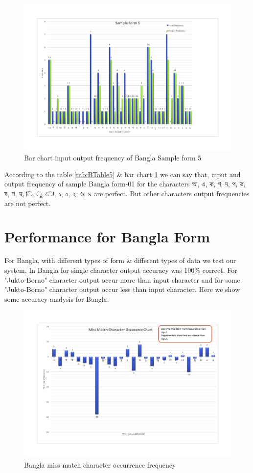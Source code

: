 \begin{figure}[H]
\centering
\includegraphics[width=1\textwidth]{Bform5.pdf}
\caption {Bar chart input output frequency of Bangla Sample form 5}
\label {fig:Bbar5}
\end{figure}

According to the table \ref{tab:BTable5} \& bar chart \ref{fig:Bbar5} we can say that, input and output frequency of sample Bangla form-01 for the characters {\bengalifont আ, এ, ক, গ, দ, প, ভ, ষ, শ, হ, ি, ু, ো, ১, ০, ২, ৬, ৯ }are perfect. But other characters output frequencies are not perfect.
\section{Performance for Bangla Form}
For Bangla, with different types of form \& different types of data we test our system. In Bangla for single character output accuracy was 100\% correct. For "Jukto-Borno" character output occur more than input character and for some "Jukto-Borno" character output occur less than input character. Here we show some accuracy analysis for Bangla.
\begin{figure}[H]
\centering
\includegraphics[width=1\textwidth]{BOccurance.pdf}
\caption {Bangla miss match character occurrence frequency}
\label {fig:BAccuracy}
\end{figure}

